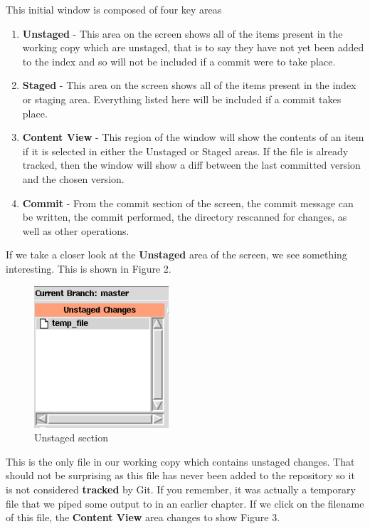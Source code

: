 This initial window is composed of four key areas
\begin{enumerate}
\item \textbf{Unstaged} - This area on the screen shows all of the items present in the working copy which are unstaged, that is to say they have not yet been added to the index and so will not be included if a commit were to take place.
\item \textbf{Staged} - This area on the screen shows all of the items present in the index or staging area.  Everything listed here will be included if a commit takes place.
\item \textbf{Content View} - This region of the window will show the contents of an item if it is selected in either the Unstaged or Staged areas.  If the file is already tracked, then the window will show a diff between the last committed version and the chosen version.
\item \textbf{Commit} - From the commit section of the screen, the commit message can be written, the commit performed, the directory rescanned for changes, as well as other operations.
\end{enumerate}

If we take a closer look at the \textbf{Unstaged} area of the screen, we see something interesting.  This is shown in Figure 2.

\begin{figure}[hbt]
\centering
\includegraphics[width=5cm]{images/f-w5-d2.png}
\caption{Unstaged section}
\end{figure}

This is the only file in our working copy which contains unstaged changes.  That should not be surprising as this file has never been added to the repository so it is not considered \textbf{tracked} by Git.  If you remember, it was actually a temporary file that we piped some output to in an earlier chapter.  If we click on the filename of this file, the \textbf{Content View} area changes to show Figure 3.


